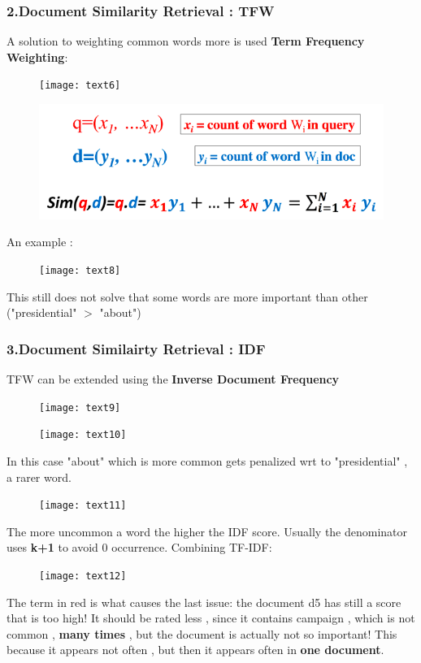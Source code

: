 \subsubsection{2.Document Similarity Retrieval : TFW}
A solution to weighting common words more is used \textbf{Term Frequency Weighting}:
\begin{figure}[H]
  \centering
  \texttt{[image: text6]}
\end{figure}
\begin{figure}[H]
  \centering
  \includegraphics[width=.7\linewidth]{text7}
\end{figure}
An example :
\begin{figure}[H]
  \centering
  \texttt{[image: text8]}
\end{figure}
This still does not solve that some words are more important than other ("presidential" $>$ "about")

\subsubsection{3.Document Similairty Retrieval : IDF}
TFW can be extended using the \textbf{Inverse Document Frequency} 
\begin{figure}[H]
  \centering
  \texttt{[image: text9]}
\end{figure}
\begin{figure}[H]
  \centering
  \texttt{[image: text10]}
\end{figure}
In this case "about" which is more common gets penalized wrt to "presidential" , a rarer word.
\begin{figure}[H]
  \centering
  \texttt{[image: text11]}
\end{figure}
The more uncommon a word the higher the IDF score. Usually the denominator uses \textbf{k+1} to avoid 0 occurrence.
Combining TF-IDF:
\begin{figure}[H]
  \centering
  \texttt{[image: text12]}
\end{figure}
The term in red is what causes the last issue: the document d5 has still a score that is too high! It should be rated less , since it contains campaign , which is not common , \textbf{many times} , but the document is actually not so important! This because it appears not often , but then it appears often in \textbf{one document}.

